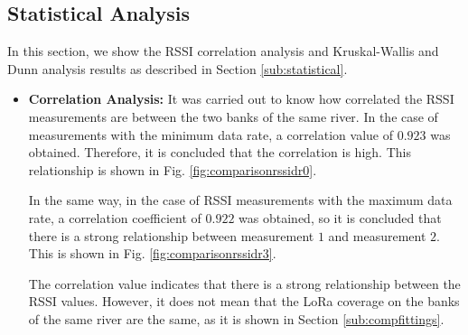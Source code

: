 \subsection{Statistical Analysis}
In this section, we show the RSSI correlation analysis and Kruskal-Wallis and Dunn analysis results as described in Section \ref{sub:statistical}.

\begin{itemize}

\item \textbf{Correlation Analysis:} It was carried out to know how correlated the RSSI measurements are between the two banks of the same river.
In the case of measurements with the minimum data rate, a correlation value of $0.923$ was obtained. Therefore, it is concluded that the correlation is high. This relationship is shown in Fig. \ref{fig:comparisonrssidr0}.


In the same way, in the case of RSSI measurements with the maximum data rate, a correlation coefficient of $0.922$ was obtained, so it is concluded that there is a strong relationship between measurement $1$ and measurement $2$. This is shown in Fig. \ref{fig:comparisonrssidr3}.


The correlation value indicates that there is a strong relationship between the RSSI values. However, it does not mean that the LoRa coverage on the banks of the same river are the same, as it is shown in Section \ref{sub:compfittings}.


\end{itemize}
